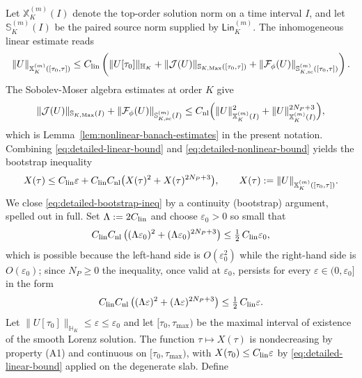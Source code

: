 \documentclass[11pt]{article}
\numberwithin{equation}{section}
\theoremstyle{plain}
\theoremstyle{definition}
\theoremstyle{remark}
\newcommand{\Lin}{\mathsf{Lin}}
\begin{document}
Let \(\mathbb X_K^{(m)}(I)\) denote the top-order solution norm on a time interval \(I\), and let \(\mathbb S_K^{(m)}(I)\) be the paired source norm supplied by \(\Lin_K^{(m)}\).  The inhomogeneous linear estimate reads
\begin{equation}\label{eq:detailed-linear-bound}
 \|U\|_{\mathbb X_K^{(m)}([\tau_0,\tau])}
 \le C_{\rm lin}\left(\|U[\tau_0]\|_{\mathbb H_K}
 +\|\mathcal J(U)\|_{\mathbb S_{K,{\rm Max}}([\tau_0,\tau])}
 +\|\mathcal F_\phi(U)\|_{\mathbb S_{K,{\rm sc}}^{(m)}([\tau_0,\tau])}\right).
\end{equation}
The Sobolev-Moser algebra estimates at order \(K\) give
\begin{equation}
 \|\mathcal J(U)\|_{\mathbb S_{K,{\rm Max}}(I)}
 +\|\mathcal F_\phi(U)\|_{\mathbb S_{K,{\rm sc}}^{(m)}(I)}
 \le C_{\rm nl}\Bigl(\|U\|_{\mathbb X_K^{(m)}(I)}^2
 +\|U\|_{\mathbb X_K^{(m)}(I)}^{2N_P+3}\Bigr),
 \label{eq:detailed-nonlinear-bound}
\end{equation}
which is Lemma~\ref{lem:nonlinear-banach-estimates} in the present notation.  Combining \eqref{eq:detailed-linear-bound} and \eqref{eq:detailed-nonlinear-bound} yields the bootstrap inequality
\begin{equation}\label{eq:detailed-bootstrap-ineq}
 X(\tau)
 \le C_{\rm lin}\varepsilon+C_{\rm lin}C_{\rm nl}\bigl(X(\tau)^2+X(\tau)^{2N_P+3}\bigr),
 \qquad
 X(\tau):=\|U\|_{\mathbb X_K^{(m)}([\tau_0,\tau])}.
\end{equation}
We close \eqref{eq:detailed-bootstrap-ineq} by a continuity (bootstrap) argument, spelled out in full.
Set \(\Lambda:=2C_{\rm lin}\) and choose \(\varepsilon_0>0\) so small that
\begin{equation}\label{eq:detailed-smallness}
 C_{\rm lin}C_{\rm nl}\left((\Lambda\varepsilon_0)^2+(\Lambda\varepsilon_0)^{2N_P+3}\right)
 \le \tfrac12\,C_{\rm lin}\varepsilon_0 ,
\end{equation}
which is possible because the left-hand side is \(O(\varepsilon_0^2)\) while the right-hand side is \(O(\varepsilon_0)\); since \(N_P\ge0\) the inequality, once valid at \(\varepsilon_0\), persists for every \(\varepsilon\in(0,\varepsilon_0]\) in the form
\begin{equation}\label{eq:detailed-smallness-mono}
 C_{\rm lin}C_{\rm nl}\left((\Lambda\varepsilon)^2+(\Lambda\varepsilon)^{2N_P+3}\right)
 \le \tfrac12\,C_{\rm lin}\varepsilon.
\end{equation}
Let \(\|U[\tau_0]\|_{\mathbb H_K}\le\varepsilon\le\varepsilon_0\) and let \([\tau_0,\tau_{\max})\) be the maximal interval of existence of the smooth Lorenz solution. The function \(\tau\mapsto X(\tau)\) is nondecreasing by property \textup{(A1)} and continuous on \([\tau_0,\tau_{\max})\), with \(X(\tau_0)\le C_{\rm lin}\varepsilon\) by \eqref{eq:detailed-linear-bound} applied on the degenerate slab. Define
\end{document}
